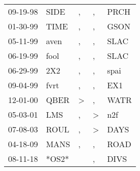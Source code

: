 \begin{supertabular}{lllll}
 09-19-98 &   SIDE &             , &             , &  PRCH \\
 01-30-99 &   TIME &             , &             , &  GSON \\
 05-11-99 &   aven &             , &             , &  SLAC \\
 06-19-99 &   fool &             , &             , &  SLAC \\
 06-29-99 &    2X2 &             , &             , &  spai \\
 09-04-99 &   fvrt &             , &             , &   EX1 \\
 12-01-00 &   QBER &  \textgreater &             , &  WATR \\
 05-03-01 &    LMS &             , &  \textgreater &   n2f \\
 07-08-03 &   ROUL &             , &  \textgreater &  DAYS \\
 04-18-09 &   MANS &             , &             , &  ROAD \\
 08-11-18 &  *OS2* &               &             , &  DIVS \\
\end{supertabular}
